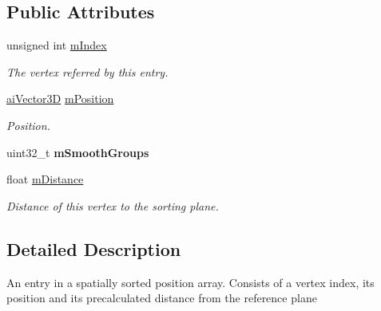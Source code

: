 \subsection*{Public Attributes}
\begin{DoxyCompactItemize}
\item 
\hypertarget{struct_assimp_1_1_s_g_spatial_sort_1_1_entry_a897b84069035cee0a813a679ae375815}{unsigned int \hyperlink{struct_assimp_1_1_s_g_spatial_sort_1_1_entry_a897b84069035cee0a813a679ae375815}{m\+Index}}\label{struct_assimp_1_1_s_g_spatial_sort_1_1_entry_a897b84069035cee0a813a679ae375815}

\begin{DoxyCompactList}\small\item\em The vertex referred by this entry. \end{DoxyCompactList}\item 
\hypertarget{struct_assimp_1_1_s_g_spatial_sort_1_1_entry_a0980fe98fe23dfeb99ab9ca1c568ca48}{\hyperlink{structai_vector3_d}{ai\+Vector3\+D} \hyperlink{struct_assimp_1_1_s_g_spatial_sort_1_1_entry_a0980fe98fe23dfeb99ab9ca1c568ca48}{m\+Position}}\label{struct_assimp_1_1_s_g_spatial_sort_1_1_entry_a0980fe98fe23dfeb99ab9ca1c568ca48}

\begin{DoxyCompactList}\small\item\em Position. \end{DoxyCompactList}\item 
\hypertarget{struct_assimp_1_1_s_g_spatial_sort_1_1_entry_ad5347532e8daf914342579793fa08dbb}{uint32\+\_\+t {\bfseries m\+Smooth\+Groups}}\label{struct_assimp_1_1_s_g_spatial_sort_1_1_entry_ad5347532e8daf914342579793fa08dbb}

\item 
\hypertarget{struct_assimp_1_1_s_g_spatial_sort_1_1_entry_aa416457a5f2e109fd35bd9b86fdc5697}{float \hyperlink{struct_assimp_1_1_s_g_spatial_sort_1_1_entry_aa416457a5f2e109fd35bd9b86fdc5697}{m\+Distance}}\label{struct_assimp_1_1_s_g_spatial_sort_1_1_entry_aa416457a5f2e109fd35bd9b86fdc5697}

\begin{DoxyCompactList}\small\item\em Distance of this vertex to the sorting plane. \end{DoxyCompactList}\end{DoxyCompactItemize}


\subsection{Detailed Description}
An entry in a spatially sorted position array. Consists of a vertex index, its position and its precalculated distance from the reference plane 

